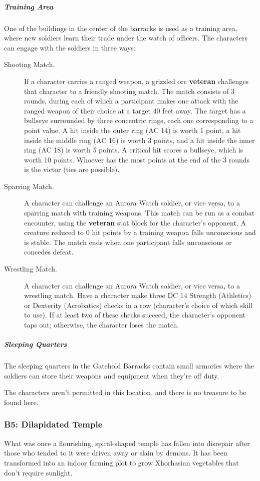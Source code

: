 \documentclass[10pt,a4paper,twoside,bg=print,twocolumn,openany,nodeprecatedcode]{dndbook}
\begin{document}
\subparagraph{Training Area}
One of the buildings in the center of the barracks is used as a training area, where new soldiers learn their trade under the watch of officers. The characters can engage with the soldiers in three ways:


\begin{description}
\item[Shooting Match.]
If a character carries a ranged weapon, a grizzled orc \textbf{veteran} challenges that character to a friendly shooting match. The match consists of 3 rounds, during each of which a participant makes one attack with the ranged weapon of their choice at a target 40 feet away. The target has a bullseye surrounded by three concentric rings, each one corresponding to a point value. A hit inside the outer ring (AC 14) is worth 1 point, a hit inside the middle ring (AC 16) is worth 3 points, and a hit inside the inner ring (AC 18) is worth 5 points. A critical hit scores a bullseye, which is worth 10 points. Whoever has the most points at the end of the 3 rounds is the victor (ties are possible).
\item[Sparring Match.]
A character can challenge an Aurora Watch soldier, or vice versa, to a sparring match with training weapons. This match can be run as a combat encounter, using the \textbf{veteran} stat block for the character's opponent. A creature reduced to 0 hit points by a training weapon falls unconscious and is stable. The match ends when one participant falls unconscious or concedes defeat.
\item[Wrestling Match.]
A character can challenge an Aurora Watch soldier, or vice versa, to a wrestling match. Have a character make three DC 14 Strength (Athletics) or Dexterity (Acrobatics) checks in a row (character's choice of which skill to use). If at least two of these checks succeed, the character's opponent taps out; otherwise, the character loses the match.
\end{description}

\subparagraph{Sleeping Quarters}
The sleeping quarters in the Gatehold Barracks contain small armories where the soldiers can store their weapons and equipment when they're off duty.

The characters aren't permitted in this location, and there is no treasure to be found here.

\subsubsection{B5: Dilapidated Temple}
What was once a flourishing, spiral-shaped temple has fallen into disrepair after those who tended to it were driven away or slain by demons. It has been transformed into an indoor farming plot to grow Xhorhasian vegetables that don't require sunlight.
\end{document}
